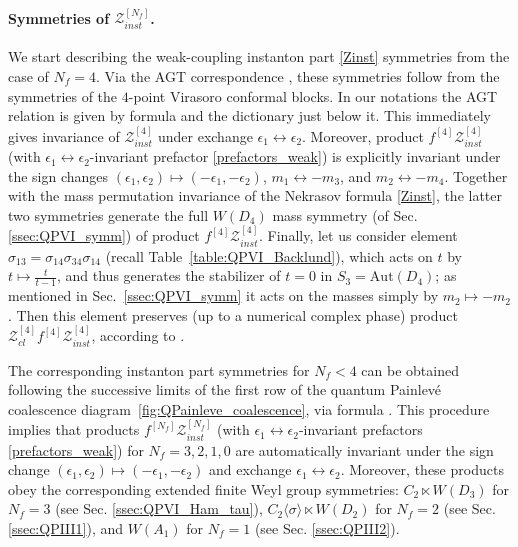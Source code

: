 \documentclass[12pt,a4paper]{article}
\numberwithin{equation}{section}
\begin{document}
\paragraph{Symmetries of $\mathcal{Z}^{[N_f]}_{inst}$.}
We start describing the weak-coupling instanton part \eqref{Zinst} symmetries from the case of $N_f=4$. Via the AGT correspondence \cite{AGT09}, these symmetries follow from the symmetries of the $4$-point Virasoro conformal blocks.
In our notations the AGT relation is given by formula \cite[(C.23)]{BST25} and the dictionary just below it. This immediately gives invariance of $\mathcal{Z}^{[4]}_{inst}$ under exchange  $\epsilon_1\leftrightarrow\epsilon_2$. Moreover, product $f^{[4]}\mathcal{Z}_{inst}^{[4]}$ (with $\epsilon_1\leftrightarrow\epsilon_2$-invariant prefactor \eqref{prefactors_weak}) is explicitly invariant under the sign changes $(\epsilon_1,\epsilon_2)\mapsto(-\epsilon_1,-\epsilon_2)$, $m_1\leftrightarrow-m_3$, and $m_2\leftrightarrow-m_4$. Together with the mass permutation invariance of the Nekrasov formula \eqref{Zinst}, the latter two symmetries generate the full $W(D_4)$ mass symmetry (of Sec. \ref{ssec:QPVI_symm}) of product $f^{[4]}\mathcal{Z}_{inst}^{[4]}$. Finally, let us consider element $\sigma_{13}=\sigma_{14}\sigma_{34}\sigma_{14}$ (recall Table~\ref{table:QPVI_Backlund}), which acts on $t$ by $t\mapsto \frac{t}{t{-}1}$, and thus generates the stabilizer of $t=0$ in $S_3=\mathrm{Aut}(D_4)$; as mentioned in Sec.~\ref{ssec:QPVI_symm} it acts
on the masses simply by $m_2\mapsto -m_2$. Then this element preserves (up to a numerical complex phase) product $\mathcal{Z}_{cl}^{[4]}f^{[4]}\mathcal{Z}_{inst}^{[4]}$, according to \cite[(2.39)]{BST25}.

The corresponding instanton part symmetries for $N_f<4$ can be obtained following the successive limits of the first row of the quantum Painlev\'e coalescence diagram~\ref{fig:QPainleve_coalescence}, via formula \cite[(3.24)]{BST25}. This procedure implies that products $f^{[N_f]}\mathcal{Z}_{inst}^{[N_f]}$ (with $\epsilon_1\leftrightarrow\epsilon_2$-invariant prefactors \eqref{prefactors_weak}) for $N_f=3,2,1,0$ are automatically invariant under the sign change $(\epsilon_1,\epsilon_2)\mapsto(-\epsilon_1,-\epsilon_2)$ and exchange $\epsilon_1\leftrightarrow\epsilon_2$. Moreover, these products obey the corresponding extended finite Weyl group symmetries:
$C_2\ltimes W(D_3)$ for $N_f=3$ (see Sec. \ref{ssec:QPVI_Ham_tau}), $C_2\langle\sigma\rangle\ltimes W(D_2)$ for $N_f=2$ (see Sec. \ref{ssec:QPIII1}), and $W(A_1)$ for $N_f=1$ (see Sec. \ref{ssec:QPIII2}). 
\end{document}
